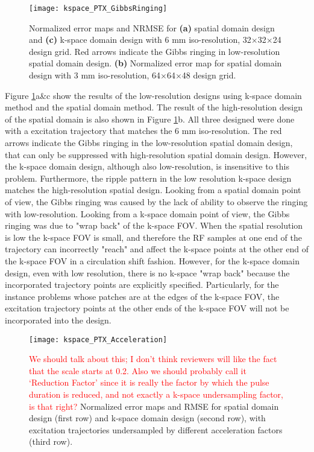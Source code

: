 \begin{figure}
	\centering
	\texttt{[image: kspace\_PTX\_GibbsRinging]}
	\caption{Normalized error maps and NRMSE for \textbf{(a)} spatial domain design and \textbf{(c)} k-space domain design with 6 mm iso-resolution, 32$\times$32$\times$24 design grid. Red arrows indicate the Gibbs ringing in low-resolution spatial domain design. \textbf{(b)} Normalized error map for spatial domain design with 3 mm iso-resolution, 64$\times$64$\times$48 design grid.}
	\label{fig:GibbsRing}
\end{figure}

Figure \ref{fig:GibbsRing}a\&c show the results of the  low-resolution designs using k-space domain method and the spatial domain method. The result of the high-resolution design of the spatial domain is also shown in Figure \ref{fig:GibbsRing}b. All three designed were done with a excitation trajectory that matches the 6 mm iso-resolution. The red arrows indicate the Gibbs ringing in the low-resolution spatial domain design, that can only be suppressed with high-resolution spatial domain design. However, the k-space domain design, although also low-resolution, is insensitive to this problem. Furthermore, the ripple pattern in the low resolution k-space design matches the high-resolution spatial design. Looking from a spatial domain point of view, the Gibbs ringing was caused by the lack of ability to observe the ringing with low-resolution. Looking from a k-space domain point of view, the Gibbs ringing was due to "wrap back" of the k-space FOV. When the spatial resolution is low the k-space FOV is small, and therefore the RF samples at one end of the trajectory can incorrectly "reach" and affect the k-space points at the other end of the k-space FOV in a circulation shift fashion. However, for the k-space domain design, even with low resolution, there is no k-space "wrap back" because the incorporated trajectory points are explicitly specified. Particularly, for the instance problems whose patches are at the edges of the k-space FOV, the excitation trajectory points at the other ends of the k-space FOV will not be incorporated into the design.    


\begin{figure}
	\centering
	\texttt{[image: kspace\_PTX\_Acceleration]}
	\caption{ \textcolor{red}{We should talk about this; I don't think reviewers will like the fact that the scale starts at 0.2. Also we should probably call it `Reduction Factor' since it is 
	really the factor by which the pulse duration is reduced, and not exactly a k-space undersampling factor, is that right?}
	Normalized error maps and RMSE for spatial domain design (first row) and k-space domain design (second row), with excitation trajectories undersampled by different acceleration factors (third row).}
	\label{fig:kspace_PTX_Acceleration}
\end{figure}

